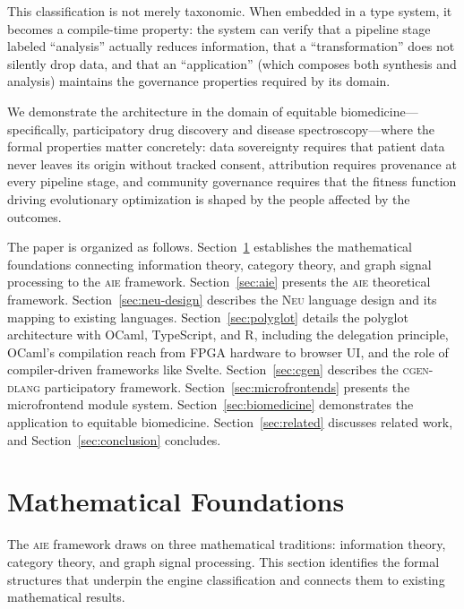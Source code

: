 \documentclass[11pt,letterpaper]{article}
\newcommand{\neu}{\textsc{Neu}}
\newcommand{\aie}{\textsc{aie}}
\newcommand{\cgen}{\textsc{cgen-dlang}}
\begin{document}
This classification is not merely taxonomic. When embedded in a type system, it becomes a compile-time property: the system can verify that a pipeline stage labeled ``analysis'' actually reduces information, that a ``transformation'' does not silently drop data, and that an ``application'' (which composes both synthesis and analysis) maintains the governance properties required by its domain.

We demonstrate the architecture in the domain of equitable biomedicine---specifically, participatory drug discovery and disease spectroscopy---where the formal properties matter concretely: data sovereignty requires that patient data never leaves its origin without tracked consent, attribution requires provenance at every pipeline stage, and community governance requires that the fitness function driving evolutionary optimization is shaped by the people affected by the outcomes.

The paper is organized as follows. Section~\ref{sec:math} establishes the mathematical foundations connecting information theory, category theory, and graph signal processing to the \aie{} framework. Section~\ref{sec:aie} presents the \aie{} theoretical framework. Section~\ref{sec:neu-design} describes the \neu{} language design and its mapping to existing languages. Section~\ref{sec:polyglot} details the polyglot architecture with OCaml, TypeScript, and R, including the delegation principle, OCaml's compilation reach from FPGA hardware to browser UI, and the role of compiler-driven frameworks like Svelte. Section~\ref{sec:cgen} describes the \cgen{} participatory framework. Section~\ref{sec:microfrontends} presents the microfrontend module system. Section~\ref{sec:biomedicine} demonstrates the application to equitable biomedicine. Section~\ref{sec:related} discusses related work, and Section~\ref{sec:conclusion} concludes.

\section{Mathematical Foundations}
\label{sec:math}

The \aie{} framework draws on three mathematical traditions: information theory, category theory, and graph signal processing. This section identifies the formal structures that underpin the engine classification and connects them to existing mathematical results.
\end{document}
